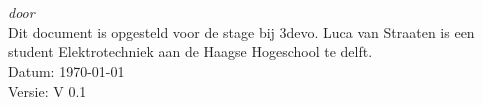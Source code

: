 \begin{titlepage}
    \vspace*{5cm}
    \makeatletter
    \begin{center}
        \begin{Huge}
            \@title
        \end{Huge}\\[0.1cm]
        \begin{Large}
            \@subtitle
        \end{Large}\\
        \emph{door}\\
        \@author
        \vfill
        Dit document is opgesteld voor de stage bij 3devo. Luca van
        Straaten is een student Elektrotechniek aan de Haagse Hogeschool te
        delft.\\
        \vspace{.5cm}
        Datum: \today\\
        Versie: V 0.1
    \end{center}
    \makeatother
\end{titlepage}

\newpage
